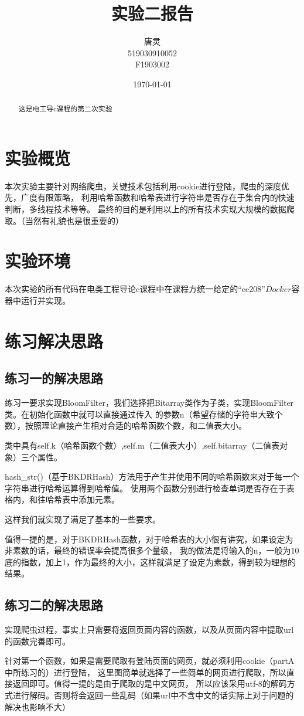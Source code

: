 \documentclass[UTF8]{ctexart}
\title{实验二报告}
\author{唐灵\\519030910052\\F1903002}
\date{\today}
\begin{document}
    \maketitle
    \begin{abstract}
        这是电工导c课程的第二次实验
    \end{abstract}
    \section{实验概览}
        本次实验主要针对网络爬虫，关键技术包括利用cookie进行登陆，爬虫的深度优先，广度有限策略，
        利用哈希函数和哈希表进行字符串是否存在于集合内的快速判断，多线程技术等等。
        最终的目的是利用以上的所有技术实现大规模的数据爬取。（当然有礼貌也是很重要的）
    \section{实验环境}
    本次实验的所有代码在电类工程导论c课程中在课程方统一给定的“ee208”$Docker$容器中运行并实现。
    \section{练习解决思路}
        \subsection{练习一的解决思路}
            练习一要求实现BloomFilter，我们选择把Bitarray类作为子类，实现BloomFilter类。在初始化函数中就可以直接通过传入
            的参数n（希望存储的字符串大致个数），按照理论直接产生相对合适的哈希函数个数，和二值表大小。\par
            类中具有self.k（哈希函数个数）,self.m（二值表大小）,self.bitarray（二值表对象）三个属性。\par
            hash\_str()（基于BKDRHash）方法用于产生并使用不同的哈希函数来对于每一个字符串进行哈希运算得到哈希值。
            使用两个函数分别进行检查单词是否存在于表格内，和往哈希表中添加元素。\par
            这样我们就实现了满足了基本的一些要求。

            值得一提的是，对于BKDRHash函数，对于哈希表的大小很有讲究，如果设定为非素数的话，最终的错误率会提高很多个量级，
            我的做法是将输入的n，一般为10底的指数，加上1，作为最终的大小，这样就满足了设定为素数，得到较为理想的结果。
        \subsection{练习二的解决思路}
            实现爬虫过程，事实上只需要将返回页面内容的函数，以及从页面内容中提取url的函数完善即可。\par
            针对第一个函数，如果是需要爬取有登陆页面的网页，就必须利用cookie（partA中所练习的）进行登陆，
            这里图简单就选择了一些简单的网页进行爬取，所以直接返回即可。值得一提的是由于爬取的是中文网页，
            所以应该采用utf-8的解码方式进行解码。否则将会返回一些乱码（如果url中不含中文的话实际上对于问题的解决也影响不大）\par
\end{document}
